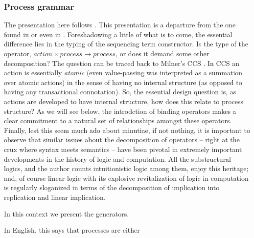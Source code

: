 \subsubsection{Process grammar}\label{subsub:process_grammar}

The presentation here follows \cite{milner91polyadicpi}. This
presentation is a departure from the one found in
\cite{ParrowWalker} or even in
\cite{FunctionsAsProcesses}. Foreshadowing a little of what is
to come, the essential difference lies in the typing of the sequencing
term constructor. Is the type of the operator, $action \times process
\to process$, or does it demand some other decomposition? The question
can be traced back to Milner's CCS \cite{MilnerCCS80}. In CCS an action
is essentially \emph{atomic} (even value-passing was interpreted as a
summation over atomic actions) in the sense of having no internal
structure (as opposed to having any transactional connotation). So,
the essential design question is, as actions are developed to have
internal structure, how does this relate to process structure? As we
will see below, the introdction of binding operators makes a clear
commitment to a natural set of relationships amongst these
operators. Finally, lest this seem much ado about minutiae, if not
nothing, it is important to observe that similar issues about the
decomposition of operators -- right at the crux where syntax meets
semantics -- have been pivotal in extremely important developments in
the history of logic and computation. All the substructural logics,
and the author counts intuitionistic logic among them, enjoy this
heritage; and, of course linear logic with its explosive
revitalization of logic in computation is regularly sloganized in
terms of the decomposition of implication into replication and linear
implication.

In this context we present the generators.


In English, this says that processes are either

